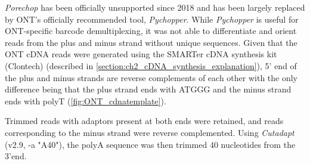 \textit{Porechop} has been officially unsupported since 2018 and has been largely replaced by ONT's officially recommended tool, \textit{Pychopper}\cite{OxfordNanoporePychopper}. While \textit{Pychopper} is useful for ONT-specific barcode demultiplexing, it was not able to differentiate and orient reads from the plus and minus strand without unique sequences. Given that the ONT cDNA reads were generated using the SMARTer cDNA synthesis kit (Clontech) (described in \cref{section:ch2_cDNA_synthesis_explanation}), 5’ end of the plus and minus strands are reverse complements of each other with the only difference being that the plus strand ends with ATGGG and the minus strand ends with polyT (\cref{fig:ONT_cdnatemplate}). 

Trimmed reads with adaptors present at both ends were retained, and reads corresponding to the minus strand were reverse complemented. Using \textit{Cutadapt}\cite{Martin2011} (v2.9, -a "A{40}"), the polyA sequence was then trimmed 40 nucleotides from the 3'end.



